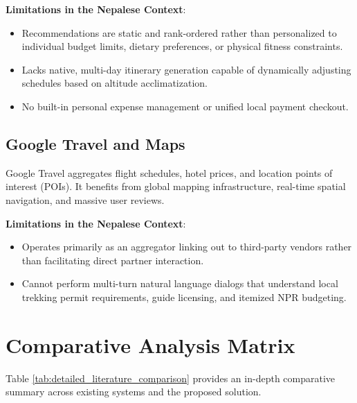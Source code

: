 \documentclass[12pt,a4paper]{report}
\begin{document}
\textbf{Limitations in the Nepalese Context}:
\begin{itemize}
    \item Recommendations are static and rank-ordered rather than personalized to individual budget limits, dietary preferences, or physical fitness constraints.
    \item Lacks native, multi-day itinerary generation capable of dynamically adjusting schedules based on altitude acclimatization.
    \item No built-in personal expense management or unified local payment checkout.
\end{itemize}

\subsection{Google Travel and Maps}
Google Travel aggregates flight schedules, hotel prices, and location points of interest (POIs). It benefits from global mapping infrastructure, real-time spatial navigation, and massive user reviews.

\textbf{Limitations in the Nepalese Context}:
\begin{itemize}
    \item Operates primarily as an aggregator linking out to third-party vendors rather than facilitating direct partner interaction.
    \item Cannot perform multi-turn natural language dialogs that understand local trekking permit requirements, guide licensing, and itemized NPR budgeting.
\end{itemize}

\section{Comparative Analysis Matrix}
Table \ref{tab:detailed_literature_comparison} provides an in-depth comparative summary across existing systems and the proposed solution.
\end{document}
